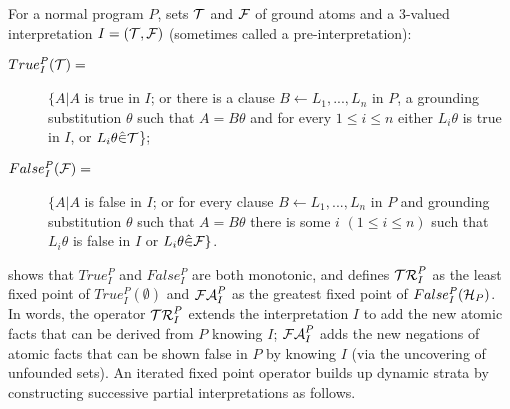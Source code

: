 \begin{definition} \label{def:dyn-ops}
For a normal program $P$, sets $\cT$ and $\cF$ of ground atoms and a
3-valued interpretation $I = (\cT,\cF)$ (sometimes called a pre-interpretation):
\begin{description} \item[$True^P_I(\cT) =$]
    $\{A|A$ is true in $I$; or there is a clause $B \leftarrow
  L_1,...,L_n$ in $P$, a grounding substitution $\theta$ such that $A
  = B\theta$ and for every $1 \leq i \leq n$ either $L_i\theta$ is
  true in $I$, or $L_i\theta \hat{\in} \cT$\};
  \item[$False^P_I(\cF) =$] 
$\{A|A$ is false in $I$; or for every clause $B \leftarrow
    L_1,...,L_n$ in $P$ and grounding substitution $\theta$ such that
    $A = B\theta$ there is some $i$ $(1 \leq i \leq n)$ such that
    $L_i\theta$ is false in $I$ or $L_i\theta \hat{\in} \cF\}$.
\end{description}
\end{definition}
%
\cite{Przy89d} shows that $True^P_I$ and $False^P_I$ are both
monotonic, and defines $\mathcal{TR}^P_I$ as the least fixed point of $True^P_I(\emptyset)$
and $\calfalse^P_I$ as the greatest fixed point of
$False^P_I(\cH_P)$.
%
In words, the operator $\mathcal{TR}^P_I$ extends the interpretation $I$ to add
the new atomic facts that can be derived from $P$ knowing $I$; $\calfalse^P_I$
adds the new negations of atomic facts that can be shown false in $P$
by knowing $I$ (via the uncovering of unfounded sets).  An iterated
fixed point operator builds up dynamic strata by constructing
successive partial interpretations as follows.

